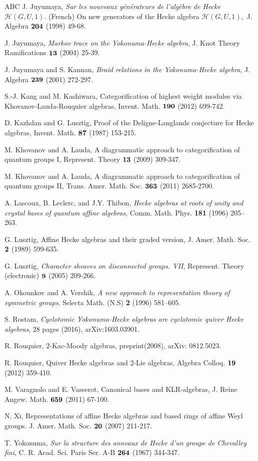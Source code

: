 \documentclass[11pt, reqno]{amsart} \textwidth=14.9cm \oddsidemargin=1cm \evensidemargin=1cm
\theoremstyle{definition}
\numberwithin{equation}{section}
\begin{document}
\begin{thebibliography}{ABC}
  J. Juyumaya, {\em Sur les nouveaux g\'en\'erateurs de l'alg\`ebre de Hecke $\mathcal{H}(G,U,1)$}. (French) On new generators of the Hecke algebra $\mathcal{H}(G,U,1),$ J. Algebra $\bf{204}$ (1998) 49-68.

  J. Juyumaya, {\em Markov trace on the Yokonuma-Hecke algebra}, J. Knot Theory Ramifications $\bf{13}$ (2004) 25-39.

  J. Juyumaya and S. Kannan, {\em Braid relations in the Yokonuma-Hecke algebra}, J. Algebra $\bf{239}$ (2001) 272-297.

 S.-J. Kang and M. Kashiwara, Categorification of highest weight modules via Khovanov-Lauda-Rouquier algebras, Invent. Math. $\bf{190}$ (2012) 699-742.

 D. Kazhdan and G. Lusztig, Proof of the Deligne-Langlands conjecture for Hecke algebras, Invent. Math. $\bf{87}$ (1987) 153-215.

 M. Khovanov and A. Lauda, A diagrammatic approach to categorification of quantum groups I, Represent. Theory $\bf{13}$ (2009) 309-347.

 M. Khovanov and A. Lauda, A diagrammatic approach to categorification of quantum groups II, Trans. Amer. Math. Soc. $\bf{363}$ (2011) 2685-2700.

 A. Lascoux, B. Leclerc, and J.Y. Thibon, {\em Hecke algebras at roots of unity and crystal bases of quantum affine algebras}, Comm. Math. Phys. {\bf 181} (1996) 205--263.

 G. Lusztig, Affine Hecke algebras and their graded version, J. Amer. Math. Soc. $\bf{2}$ (1989) 599-635.

 G. Lusztig, {\em Character sheaves on disconnected groups. VII}, Represent. Theory (electronic) $\bf{9}$ (2005) 209-266.

 A. Okounkov and A. Vershik, {\em A new approach to representation theory of symmetric groups}, Selecta Math. (N.S) {\bf 2} (1996) 581--605.

 S. Rostam,  {\em Cyclotomic Yokonuma-Hecke algebras are cyclotomic quiver Hecke algebras}, 28 pages (2016), arXiv:1603.03901.

 R. Rouquier, 2-Kac-Moody algebras, preprint(2008), arXiv: 0812.5023.

 R. Rouquier, Quiver Hecke algebras and 2-Lie algebras, Algebra Colloq. $\bf{19}$ (2012) 359-410.

 M. Varagnolo and E. Vasserot, Canonical bases and KLR-algebras, J. Reine Angew. Math. $\bf{659}$ (2011) 67-100.

 N. Xi, Representations of affine Hecke algebras and based rings of affine Weyl groups. J. Amer. Math. Soc. $\bf{20}$ (2007) 211-217.

  T. Yokonuma, {\em Sur la structure des anneaux de Hecke d'un groupe de Chevalley fini}, C. R. Acad. Sci. Paris Ser. A-B $\bf{264}$ (1967) 344-347.

\end{thebibliography}
\end{document}
